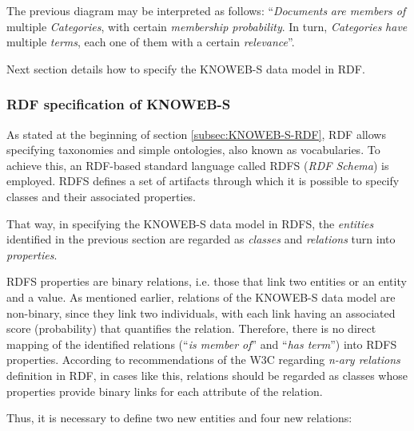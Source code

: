 The previous diagram may be interpreted as follows: \textquotedblleft{}\emph{Documents} \emph{are members of} multiple \emph{Categories}, with certain \emph{membership probability}. In turn, \emph{Categories} \emph{have} multiple \emph{terms}, each one of them with a certain \emph{relevance}\textquotedblright{}. 

Next section details how to specify the KNOWEB-S data model in RDF. 

\subsubsection{RDF specification of KNOWEB-S}
\label{subsub:RDF-spec-of-KNOWEB}

As stated at the beginning of section \ref{subsec:KNOWEB-S-RDF}, RDF allows specifying taxonomies and simple ontologies, also known as vocabularies. To achieve this, an RDF-based standard language called RDFS (\emph{RDF Schema}) \cite{W3C:2004b} is employed. RDFS defines a set of artifacts through which it is possible to specify classes and their associated properties.

That way, in specifying the KNOWEB-S data model in RDFS, the \emph{entities} identified in the previous section are regarded as \emph{classes} and \emph{relations} turn into \emph{properties}. 

RDFS properties are binary relations, i.e. those that link two entities or an entity and a value. As mentioned earlier, relations of the KNOWEB-S data model are non-binary, since they link two individuals, with each link having an associated score (probability) that quantifies the relation. Therefore, there is no direct mapping of the identified relations (\textquotedblleft{}\emph{is member of}\textquotedblright{} and \textquotedblleft{}\emph{has term}\textquotedblright{}) into RDFS properties. According to recommendations of the W3C \cite{W3C:2006} regarding \emph{n-ary relations }definition in RDF, in cases like this, relations should be regarded as classes whose properties provide binary links for each attribute of the relation.

Thus, it is necessary to define two new entities and four new relations:

